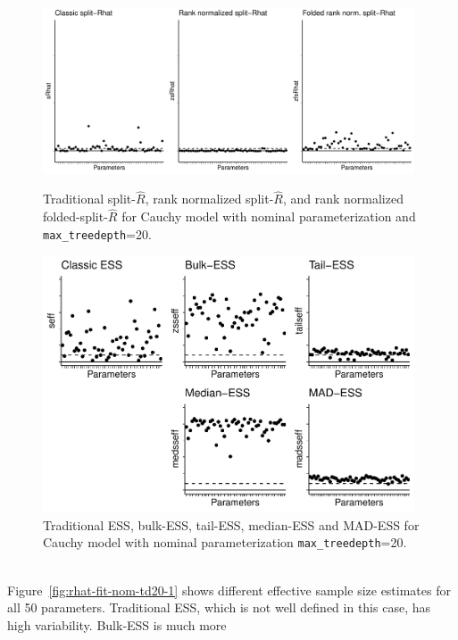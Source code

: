 \documentclass[american,]{article}
\theoremstyle{definition}
\begin{document}
\begin{figure}[tp]
  \centering
  \begin{minipage}{0.48\textwidth}
  \includegraphics[width=0.98\textwidth]{graphics/rhat-fit-nom-td20-1.pdf}
  \caption{Traditional split-\(\widehat{R}\), rank normalized
    split-\(\widehat{R}\), and rank normalized
    folded-split-\(\widehat{R}\) for Cauchy model with nominal
    parameterization and \texttt{max\_treedepth}=20.}
  \label{fig:rhat-fit-nom-td20-1}
\end{minipage}
\hfill
  \begin{minipage}{0.48\textwidth}
  \includegraphics[width=0.98\textwidth]{graphics/ess-fit-nom-td20-1.pdf}
  \caption{Traditional ESS, bulk-ESS, tail-ESS, median-ESS and MAD-ESS for
    Cauchy model with nominal parameterization \texttt{max\_treedepth}=20.\\~}
  \label{fig:ess-fit-nom-td20-1}
\end{minipage}
\end{figure}
Figure~\ref{fig:rhat-fit-nom-td20-1} shows different effective sample
size estimates for all 50 parameters. Traditional ESS, which is not well
defined in this case, has high variability. Bulk-ESS is much more
\end{document}

